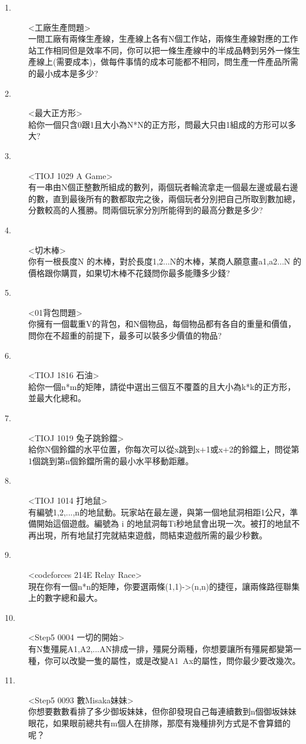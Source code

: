 \documentclass{article}
\begin{document}
\begin{description}
\item[ 1.]<工廠生產問題>\\
一間工廠有兩條生產線，生產線上各有N個工作站，兩條生產線對應的工作站工作相同但是效率不同，你可以把一條生產線中的半成品轉到另外一條生產線上(需要成本)，做每件事情的成本可能都不相同，問生產一件產品所需的最小成本是多少?
\item[ 2.]<最大正方形>\\
給你一個只含0跟1且大小為N*N的正方形，問最大只由1組成的方形可以多大?
\item[ 3.]<TIOJ 1029 A Game>\\
有一串由N個正整數所組成的數列，兩個玩者輪流拿走一個最左邊或最右邊的數，直到最後所有的數都取完之後，兩個玩者分別把自己所取到數加總，分數較高的人獲勝。問兩個玩家分別所能得到的最高分數是多少?
\item[ 4.]<切木棒>\\
你有一根長度N 的木棒，對於長度1,2...N的木棒，某商人願意畫a1,a2...N 的價格跟你購買，如果切木棒不花錢問你最多能賺多少錢?
\item[ 5.]<01背包問題>\\
你擁有一個載重V的背包，和N個物品，每個物品都有各自的重量和價值，問你在不超重的前提下，最多可以裝多少價值的物品?
\item[ 6.]<TIOJ 1816 石油>\\
給你一個n*m的矩陣，請從中選出三個互不覆蓋的且大小為k*k的正方形，並最大化總和。
\item[ 7.]<TIOJ 1019 兔子跳鈴鐺>\\
給你N個鈴鐺的水平位置，你每次可以從x跳到x+1或x+2的鈴鐺上，問從第1個跳到第n個鈴鐺所需的最小水平移動距離。
\item[ 8.]<TIOJ 1014 打地鼠>\\
有編號1,2,...,n的地鼠動。玩家站在最左邊，與第一個地鼠洞相距1公尺，準備開始這個遊戲。編號為 i 的地鼠洞每Ti秒地鼠會出現一次。被打的地鼠不再出現，所有地鼠打完就結束遊戲，問結束遊戲所需的最少秒數。
\item[ 9.]<codeforces 214E Relay Race>\\
現在你有一個n*n的矩陣，你要選兩條(1,1)->(n,n)的捷徑，讓兩條路徑聯集上的數字總和最大。
\item[ 10.]<Step5 0004 一切的開始>\\
有N隻殭屍A1,A2,...AN排成一排，殭屍分兩種，你想要讓所有殭屍都變第一種，你可以改變一隻的屬性，或是改變A1~Ax的屬性，問你最少要改幾次。
\item[ 11.]<Step5 0093 數Misaka妹妹>\\
你想要數數看排了多少御坂妹妹，但你卻發現自己每連續數到n個御坂妹妹眼花，如果眼前總共有m個人在排隊，那麼有幾種排列方式是不會算錯的呢？
\end{description}
\end{document}
